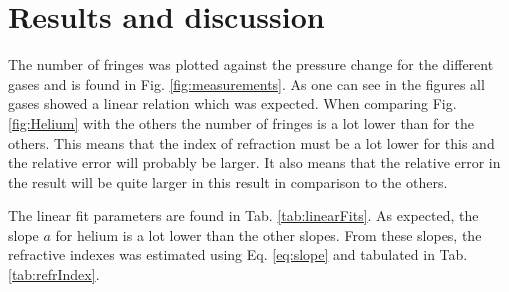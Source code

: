 \section{Results and discussion}
The number of fringes was plotted against the pressure change for the different gases and is found in Fig. \ref{fig:measurements}. As one can see in the figures all gases showed a linear relation which was expected. When comparing Fig. \ref{fig:Helium} with the others the number of fringes is a lot lower than for the others. This means that the index of refraction must be a lot lower for this and the relative error will probably be larger. It also means that the relative error in the result will be quite larger in this result in comparison to the others.

The linear fit parameters are found in Tab. \ref{tab:linearFits}. As expected, the slope $a$ for helium is a lot lower than the other slopes. From these slopes, the refractive indexes was estimated using Eq. \eqref{eq:slope} and tabulated in Tab. \ref{tab:refrIndex}.

